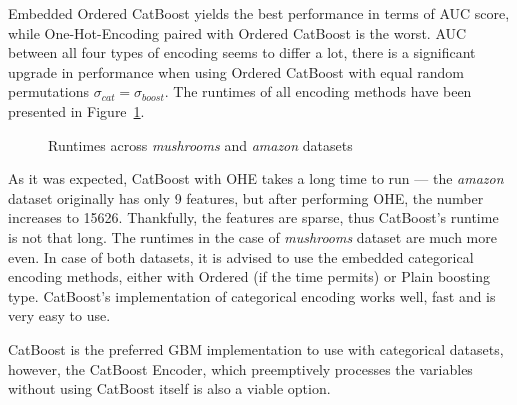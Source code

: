 \documentclass[magisterska, english]{pwr_wmat_praca_dyplomowa}
\theoremstyle{plain}
\numberwithin{theorem}{chapter}
\theoremstyle{definition}
\numberwithin{theorem}{chapter}
\begin{document}
Embedded Ordered CatBoost yields the best performance in terms of AUC score, while One-Hot-Encoding paired with Ordered CatBoost is the worst. AUC between all four types of encoding seems to differ a lot, there is a significant upgrade in performance when using Ordered CatBoost with equal random permutations $\sigma_{cat} = \sigma_{boost}$. The runtimes of all encoding methods have been presented in Figure~\ref{fig:catboost_categorical_runtimes}.

\begin{figure}[H]
	\centering
	\caption{Runtimes across \emph{mushrooms} and \emph{amazon} datasets}
	\label{fig:catboost_categorical_runtimes}
\end{figure}

As it was expected, CatBoost with OHE takes a long time to run --- the \emph{amazon} dataset originally has only 9 features, but after performing OHE, the number increases to 15626. Thankfully, the features are sparse, thus CatBoost's runtime is not that long. The runtimes in the case of \emph{mushrooms} dataset are much more even. In case of both datasets, it is advised to use the embedded categorical encoding methods, either with Ordered (if the time permits) or Plain boosting type. CatBoost's implementation of categorical encoding works well, fast and is very easy to use. 

CatBoost is the preferred GBM implementation to use with categorical datasets, however, the CatBoost Encoder, which preemptively processes the variables without using CatBoost itself is also a viable option.

\newpage
\nocite{*} 
\end{document}

